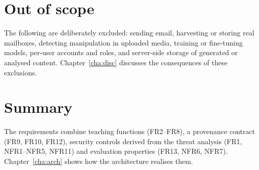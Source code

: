 \section{Out of scope}
\label{sec:oos}

The following are deliberately excluded: sending email, harvesting or storing real mailboxes, detecting manipulation in uploaded media, training or fine-tuning models, per-user accounts and roles, and server-side storage of generated or analysed content. Chapter~\ref{cha:disc} discusses the consequences of these exclusions.

\section{Summary}

The requirements combine teaching functions (FR2--FR8), a provenance contract (FR9, FR10, FR12), security controls derived from the threat analysis (FR1, NFR1--NFR5, NFR11) and evaluation properties (FR13, NFR6, NFR7). Chapter~\ref{cha:arch} shows how the architecture realises them.
